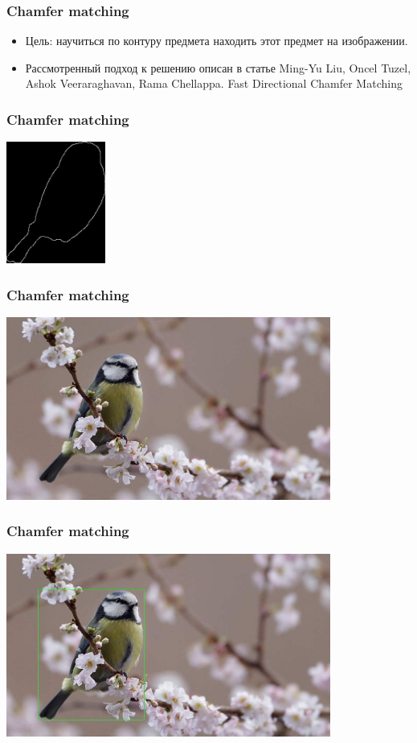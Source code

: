 \begin{frame}\frametitle{Chamfer matching}
    \begin{itemize}
        \item Цель: научиться по контуру предмета находить этот предмет на изображении.
        \pause
        \item Рассмотренный подход к решению описан в статье
        Ming-Yu Liu, Oncel Tuzel, Ashok Veeraraghavan, Rama Chellappa. Fast Directional Chamfer Matching
    \end{itemize}
\end{frame}

\begin{frame}\frametitle{Chamfer matching}
    \begin{center}
        \includegraphics[height=4cm]{veselov_imgs/pattern3.jpg}
    \end{center}
\end{frame}

\begin{frame}\frametitle{Chamfer matching}
    \begin{center}
        \includegraphics[height=6cm]{veselov_imgs/image3.jpg}
    \end{center}
\end{frame}

\begin{frame}\frametitle{Chamfer matching}
    \begin{center}
        \includegraphics[height=6cm]{veselov_imgs/occurrence3.jpg}
    \end{center}
\end{frame}

